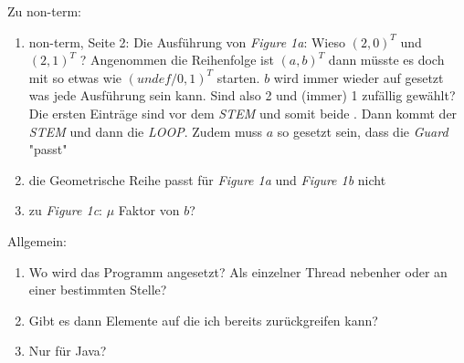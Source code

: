 Zu non-term:
\begin{enumerate}
	\item non-term, Seite 2: Die Ausführung von \textit{Figure 1a}: Wieso $ \left( 2,0 \right)^T$ und $ \left( 2,1 \right)^T$ ? Angenommen die Reihenfolge ist $ \left( a,b \right)^T$ dann müsste es doch mit so etwas wie $ \left( undef/0,1 \right)^T$ starten. $b$ wird immer wieder auf  gesetzt was jede Ausführung sein kann. Sind also 2 und (immer) 1 zufällig gewählt? \idea Die ersten Einträge sind vor dem \emph{STEM} und somit beide . Dann kommt der \emph{STEM} und dann die \emph{LOOP}. Zudem muss $a$ so gesetzt sein, dass die \textit{Guard} "passt"
	\item die Geometrische Reihe passt für \textit{Figure 1a} und \textit{Figure 1b} nicht
	\item zu \textit{Figure 1c}: $\mu$ Faktor von $b$?
\end{enumerate}

Allgemein:
\begin{enumerate}	
	\item Wo wird das Programm angesetzt? Als einzelner Thread nebenher oder an einer bestimmten Stelle?
	\item Gibt es dann Elemente auf die ich bereits zurückgreifen kann?
	\item Nur für Java?
\end{enumerate}